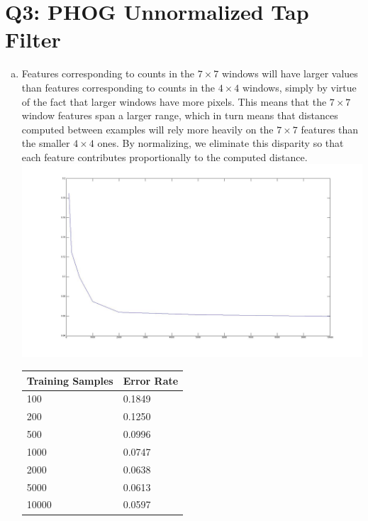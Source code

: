 \documentclass[12pt]{article}
\begin{document}
\section*{Q3: PHOG Unnormalized Tap Filter}
  \begin{enumerate}[c.]
    \item Features corresponding to counts in the $7 \times 7$ windows will have
      larger values than features corresponding to counts in the $4 \times 4$
      windows, simply by virtue of the fact that larger windows have more
      pixels. This means that the $7 \times 7$ window features span a larger
      range, which in turn means that distances computed between examples will
      rely more heavily on the $7 \times 7$ features than the smaller $4 \times
      4$ ones. By normalizing, we eliminate this disparity so that each feature
      contributes proportionally to the computed distance. \\
      \includegraphics[scale=0.3]{q3_unnormalized.jpg}
      \begin{tabular}{l|l}
        \hline
        Training Samples & Error Rate \\
        \hline
        100   & 0.1849 \\
        200   & 0.1250 \\
        500   & 0.0996 \\
        1000  & 0.0747 \\
        2000  & 0.0638 \\
        5000  & 0.0613 \\
        10000 & 0.0597 \\
      \end{tabular}
  \end{enumerate}

\newpage
\end{document}
